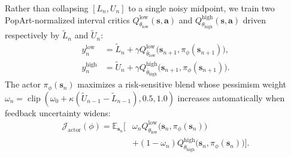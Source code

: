 Rather than collapsing $[L_n, U_n]$ to a single noisy midpoint, we train two PopArt-normalized interval critics $Q_{\theta_{\mathrm{low}}}^{\mathrm{low}}(\mathbf{s}, \mathbf{a})$ and $Q_{\theta_{\mathrm{high}}}^{\mathrm{high}}(\mathbf{s}, \mathbf{a})$ driven respectively by $\tilde{L}_n$ and $\tilde{U}_n$:
\begin{equation}
\begin{aligned}
    y_n^{\mathrm{low}} &= \tilde{L}_n + \gamma Q_{\bar{\theta}_{\mathrm{low}}}^{\mathrm{low}}\big(\mathbf{s}_{n+1}, \pi_\phi(\mathbf{s}_{n+1})\big), \\
    y_n^{\mathrm{high}} &= \tilde{U}_n + \gamma Q_{\bar{\theta}_{\mathrm{high}}}^{\mathrm{high}}\big(\mathbf{s}_{n+1}, \pi_\phi(\mathbf{s}_{n+1})\big).
\end{aligned}
    \label{eq:dual_td}
\end{equation}
The actor $\pi_\phi(\mathbf{s}_n)$ maximizes a risk-sensitive blend whose pessimism weight $\omega_n = \operatorname{clip}(\omega_0 + \kappa(\tilde{U}_{n-1}-\tilde{L}_{n-1}), 0.5, 1.0)$ increases automatically when feedback uncertainty widens:
\begin{equation}
\begin{aligned}
    \mathcal{J}_{\mathrm{actor}}(\phi) = \mathbb{E}_{\mathbf{s}_n}\Big[
        &\omega_n Q_{\theta_{\mathrm{low}}}^{\mathrm{low}}\big(\mathbf{s}_n, \pi_\phi(\mathbf{s}_n)\big) \\
        &+ (1-\omega_n) Q_{\theta_{\mathrm{high}}}^{\mathrm{high}}\big(\mathbf{s}_n, \pi_\phi(\mathbf{s}_n)\big)
    \Big].
\end{aligned}
    \label{eq:actor_obj}
\end{equation}

